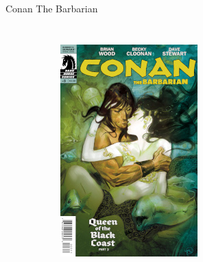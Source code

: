 \begin{frame}{Conan The Barbarian}
\begin{columns}
\begin{figure}[htp]
\begin{subfigure}[b]{0.23\textwidth}
				\includegraphics[width=\textwidth]{img/DH-CTB-03}
			\end{subfigure}
			\\
			\begin{subfigure}[b]{0.23\textwidth}

\end{subfigure}
\end{figure}
\end{columns}
\end{frame}
